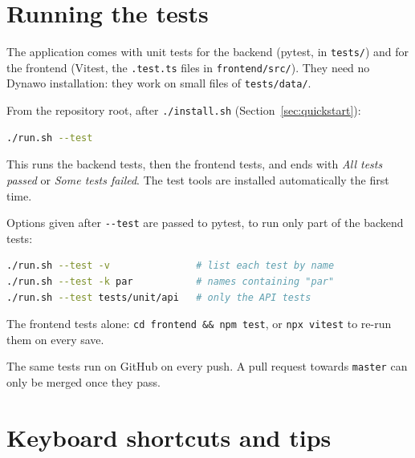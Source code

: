 \documentclass[a4paper,11pt]{article}
\newcommand{\code}[1]{\texttt{\small #1}}
\begin{document}
\section{Running the tests}
\label{sec:tests}

The application comes with unit tests for the backend (pytest, in \code{tests/})
and for the frontend (Vitest, the \code{*.test.ts} files in \code{frontend/src/}).
They need no Dynawo installation: they work on small files of \code{tests/data/}.

From the repository root, after \code{./install.sh}
(Section~\ref{sec:quickstart}):

\begin{lstlisting}[language=bash]
./run.sh --test
\end{lstlisting}

This runs the backend tests, then the frontend tests, and ends with
\emph{All tests passed} or \emph{Some tests failed}. The test tools are
installed automatically the first time.

Options given after \code{-{}-test} are passed to pytest, to run only part of the
backend tests:

\begin{lstlisting}[language=bash]
./run.sh --test -v               # list each test by name
./run.sh --test -k par           # names containing "par"
./run.sh --test tests/unit/api   # only the API tests
\end{lstlisting}

The frontend tests alone: \code{cd frontend \&\& npm test}, or
\code{npx vitest} to re-run them on every save.

\begin{notebox}
The same tests run on GitHub on every push. A pull request towards
\code{master} can only be merged once they pass.
\end{notebox}

\section{Keyboard shortcuts and tips}
\end{document}
